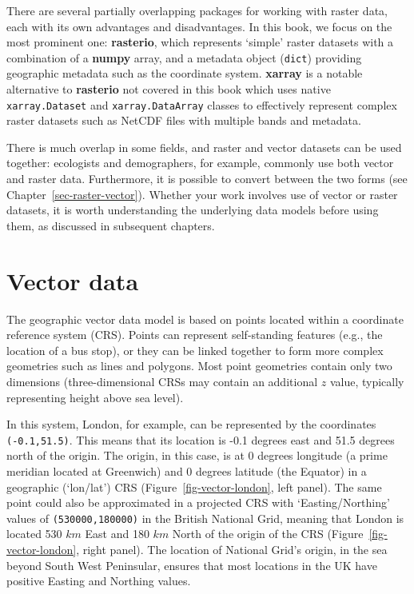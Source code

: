 \documentclass[
  letterpaper,
]{krantz}
\begin{document}
There are several partially overlapping packages for working with raster
data, each with its own advantages and disadvantages. In this book, we
focus on the most prominent one: \textbf{rasterio}, which represents
`simple' raster datasets with a combination of a \textbf{numpy} array,
and a metadata object (\texttt{dict}) providing geographic metadata such
as the coordinate system. \textbf{xarray} is a notable alternative to
\textbf{rasterio} not covered in this book which uses native
\texttt{xarray.Dataset} and \texttt{xarray.DataArray} classes to
effectively represent complex raster datasets such as NetCDF files with
multiple bands and metadata.

There is much overlap in some fields, and raster and vector datasets can
be used together: ecologists and demographers, for example, commonly use
both vector and raster data. Furthermore, it is possible to convert
between the two forms (see Chapter~\ref{sec-raster-vector}). Whether
your work involves use of vector or raster datasets, it is worth
understanding the underlying data models before using them, as discussed
in subsequent chapters.

\section{Vector data}\label{sec-vector-data}

The geographic vector data model is based on points located within a
coordinate reference system (CRS). Points can represent self-standing
features (e.g., the location of a bus stop), or they can be linked
together to form more complex geometries such as lines and polygons.
Most point geometries contain only two dimensions (three-dimensional
CRSs may contain an additional \(z\) value, typically representing
height above sea level).

In this system, London, for example, can be represented by the
coordinates \texttt{(-0.1,51.5)}. This means that its location is -0.1
degrees east and 51.5 degrees north of the origin. The origin, in this
case, is at 0 degrees longitude (a prime meridian located at Greenwich)
and 0 degrees latitude (the Equator) in a geographic (`lon/lat') CRS
(Figure~\ref{fig-vector-london}, left panel). The same point could also
be approximated in a projected CRS with `Easting/Northing' values of
\texttt{(530000,180000)} in the British National Grid, meaning that
London is located 530 \(km\) East and 180 \(km\) North of the origin of
the CRS (Figure~\ref{fig-vector-london}, right panel). The location of
National Grid's origin, in the sea beyond South West Peninsular, ensures
that most locations in the UK have positive Easting and Northing values.
\end{document}
